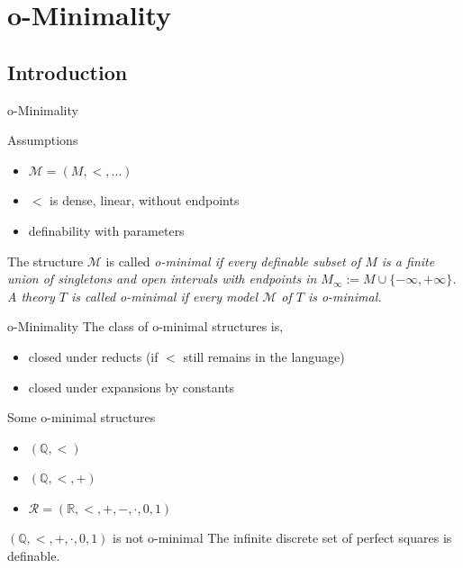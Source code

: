 
\section{o-Minimality}
\subsection{Introduction}


\begin{frame}[c]{o-Minimality}
	\begin{block}{Assumptions}
		\begin{itemize}
			\item $\mathcal{M}=(M,<,\ldots)$
			\item $<$ is dense, linear, without endpoints
			\item definability with parameters
		\end{itemize}
	\end{block}

	\begin{definition}
		The structure $\mathcal{M}$ is called \em o-minimal \em if every definable subset of $M$ is a finite union of singletons and open intervals with endpoints in $M_{\infty}:=M\cup\{-\infty,+\infty\}$.\\
		A theory $T$ is called \em o-minimal \em if every model $\mathcal{M}$ of $T$ is o-minimal.
	\end{definition}
\end{frame}

\begin{frame}[c]{o-Minimality}
	The class of o-minimal structures is,
		\begin{itemize}
			\item closed under reducts (if $<$ still remains in the language)
			\item closed under expansions by constants
		\end{itemize}

	\begin{exampleblock}{Some o-minimal structures}
		\begin{itemize}
			\item $(\mathbb{Q},<)$
			\item $(\mathbb{Q},<,+)$
			\item $\mathcal{R}=(\mathbb{R},<,+,-,\cdot,0,1)$
		\end{itemize}
	\end{exampleblock}

	\begin{block}{$(\mathbb{Q},<,+,\cdot,0,1)$ is not o-minimal}
		The infinite discrete set of perfect squares is definable.
	\end{block}
\end{frame}

